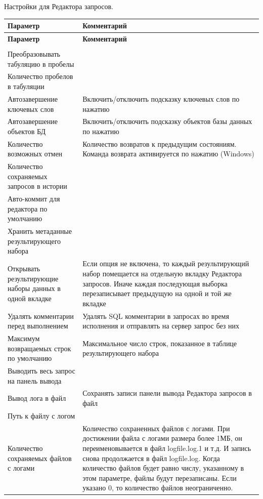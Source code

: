 Настройки для Редактора запросов.
\begin{longtable}[r]{|>{\ttfamily}m{6cm}|m{9cm}|}
	\hline
	\centering\normalfont\bfseries Параметр &
	\centering\arraybslash\bfseries Комментарий\\\hline
	\endfirsthead
	\hline
	\centering\normalfont\bfseries Параметр &
	\centering\arraybslash\bfseries Комментарий\\\hline
	\endhead
	\hline
	\rowcolor[gray]{.9}\multicolumn{2}{|m{15.25cm}|}{\bfseries Общие}\\\hline 
	Преобразовывать табуляцию в пробелы
	&  \\\hline
	Количество пробелов в табуляции
	&  \\\hline
	Автозавершение ключевых слов 
	& Включить/отключить подсказку ключевых слов по нажатию \ttt{Ctrl+Space}\\\hline
	Автозавершение объектов БД 
	& Включить/отключить подсказку объектов базы данных по нажатию \ttt{Ctrl+Space}\\\hline
	Количество возможных отмен
	& Количество возвратов к предыдущим состояниям. Команда возврата активируется по нажатию \ttt{Ctrl+Z} (Windows) \\\hline 
	Количество сохраняемых запросов в истории
	& \\\hline 
	Авто-коммит для редактора по умолчанию
	&  \\\hline 
	Хранить метаданные результирующего набора 
	& \\\hline
	Открывать результирующие наборы данных в одной вкладке
	& Если опция не включена, то каждый результирующий набор помещается на отдельную вкладку Редактора запросов. Иначе каждая последующая выборка перезаписывает предыдущую на одной и той же вкладке \\\hline  
	Удалять комментарии перед выполнением 
	& Удалять SQL комментарии в запросах во время исполнения и отправлять на сервер запрос без них \\\hline
	Максимум возвращаемых строк по умолчанию
	& Максимальное число строк, показанное в таблице результирующего набора \\\hline 
	Выводить весь запрос на панель вывода 
	& \\\hline 
	Вывод лога в файл
	&  Сохранять записи панели вывода Редактора запросов в файл\\\hline 
	Путь к файлу с логом
	&  \\\hline
	Количество сохраняемых файлов с логами
	& Количество сохраненных файлов с логами. При достижении файла с логами размера более 1МБ, он переименовывается в файл logfile.log.1 и т.д. И запись снова продолжается в файл logfile.log. Когда количество файлов будет равно числу, указанному в этом параметре, файлы будут перезаписаны. Если указано 0, то количество файлов неограниченно.\\\hline

\end{longtable}
